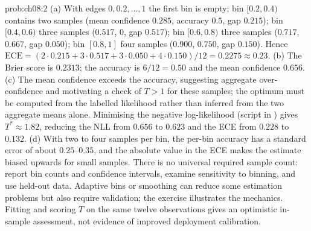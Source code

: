\begin{sol}{prob:ch08:2}
(a) With edges $0,0.2,\dots,1$ the first bin is empty; bin $[0.2,0.4)$ contains two samples (mean confidence $0.285$, accuracy $0.5$, gap $0.215$); bin $[0.4,0.6)$ three samples ($0.517$, $0$, gap $0.517$); bin $[0.6,0.8)$ three samples ($0.717$, $0.667$, gap $0.050$); bin $[0.8,1]$ four samples ($0.900$, $0.750$, gap $0.150$). Hence $\mathrm{ECE}=(2\cdot0.215+3\cdot0.517+3\cdot0.050+4\cdot0.150)/12=0.2275\approx0.23$. (b) The Brier score is $0.2313$; the accuracy is $6/12=0.50$ and the mean confidence $0.656$. (c) The mean confidence exceeds the accuracy, suggesting aggregate over-confidence and motivating a check of $T>1$ for these samples; the optimum must be computed from the labelled likelihood rather than inferred from the two aggregate means alone. Minimising the negative log-likelihood (script  in ) gives $T^\ast\approx1.82$, reducing the NLL from $0.656$ to $0.623$ and the ECE from $0.228$ to $0.132$. (d) With two to four samples per bin, the per-bin accuracy has a standard error of about $0.25$--$0.35$, and the absolute value in the ECE makes the estimate biased upwards for small samples. There is no universal required sample count: report bin counts and confidence intervals, examine sensitivity to binning, and use held-out data. Adaptive bins or smoothing can reduce some estimation problems but also require validation; the exercise illustrates the mechanics. Fitting and scoring $T$ on the same twelve observations gives an optimistic in-sample assessment, not evidence of improved deployment calibration.
\end{sol}

